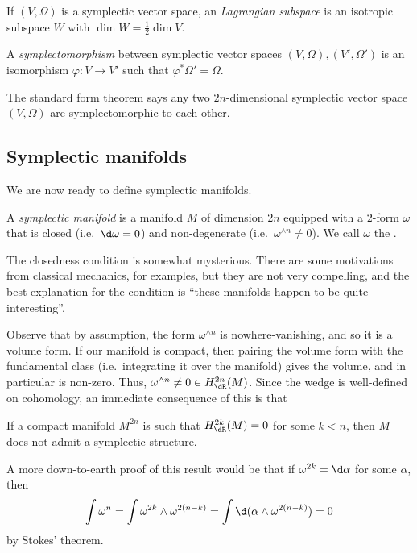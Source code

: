 \documentclass[a4paper]{article}
\begin{document}
\begin{defi}
  If $(V, \Omega)$ is a symplectic vector space, an \emph{Lagrangian subspace} is an isotropic subspace $W$ with $\dim W = \frac{1}{2} \dim V$.
\end{defi}

\begin{defi}[Symplectomorphism]
  A \emph{symplectomorphism} between symplectic vector spaces $(V, \Omega), (V', \Omega')$ is an isomorphism $\varphi: V \to V'$ such that $\varphi^* \Omega' = \Omega$.
\end{defi}

The standard form theorem says any two $2n$-dimensional symplectic vector space $(V, \Omega)$ are symplectomorphic to each other.

\subsection{Symplectic manifolds}
We are now ready to define symplectic manifolds.
\begin{defi}
  A \emph{symplectic manifold} is a manifold $M$ of dimension $2n$ equipped with a $2$-form $\omega$ that is closed (i.e.\ $\d \omega = 0$) and non-degenerate (i.e.\ $\omega^{\wedge n} \not= 0$). We call $\omega$ the .
\end{defi}

The closedness condition is somewhat mysterious. There are some motivations from classical mechanics, for examples, but they are not very compelling, and the best explanation for the condition is ``these manifolds happen to be quite interesting''.

Observe that by assumption, the form $\omega^{\wedge n}$ is nowhere-vanishing, and so it is a volume form. If our manifold is compact, then pairing the volume form with the fundamental class (i.e.\ integrating it over the manifold) gives the volume, and in particular is non-zero. Thus, $\omega^{\wedge n}\not= 0 \in H^{2n}_{\dR}(M)$. Since the wedge is well-defined on cohomology, an immediate consequence of this is that
\begin{prop}
  If a compact manifold $M^{2n}$ is such that $H_{\dR}^{2k}(M) = 0$ for some $k < n$, then $M$ does not admit a symplectic structure.
\end{prop}
A more down-to-earth proof of this result would be that if $\omega^{2k} = \d \alpha$ for some $\alpha$, then
\[
  \int \omega^n = \int \omega^{2k} \wedge \omega^{2(n - k)} = \int \d (\alpha \wedge \omega^{2(n - k)}) = 0
\]
by Stokes' theorem.
\end{document}
